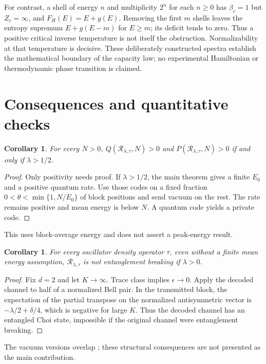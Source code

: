 \documentclass[11pt]{article}
\newtheorem{corollary}[theorem]{Corollary}
\newcommand{\Rcal}{\mathcal R_{\lambda,\tau}}
\begin{document}
For contrast, a shell of energy $n$ and multiplicity $2^n$ for
each $n\ge0$ has $\beta_c=1$ but $Z_c=\infty$, and
$F_H(E)=E+g(E)$. Removing the first $m$ shells leaves the entropy
supremum $E+g(E-m)$ for $E\ge m$; its deficit tends to zero.
Thus a positive critical inverse temperature is not itself the
obstruction. Normalizability at that temperature is decisive.
These deliberately constructed spectra establish the mathematical
boundary of the capacity law; no experimental Hamiltonian or
thermodynamic phase transition is claimed.


\section{Consequences and quantitative checks}
\begin{corollary}
For every $N>0$, $Q(\Rcal,N)>0$ and $P(\Rcal,N)>0$
if and only if $\lambda>1/2$.
\end{corollary}
\begin{proof}
Only positivity needs proof. If $\lambda>1/2$, the main theorem gives
a finite $E_0$ and a positive quantum rate. Use those codes on a fixed
fraction $0<\theta<\min\{1,N/E_0\}$ of block positions and send vacuum
on the rest. The rate remains positive and mean energy is below $N$.
A quantum code yields a private code.
\end{proof}
This uses block-average energy and does not assert a peak-energy result.

\begin{corollary}
For every oscillator density operator $\tau$, even without a finite mean
energy assumption, $\Rcal$ is not entanglement breaking if $\lambda>0$.
\end{corollary}
\begin{proof}
Fix $d=2$ and let $K\to\infty$. Trace class implies $\epsilon\to0$.
Apply the decoded channel to half of a normalized Bell pair.
In the transmitted block, the expectation of the partial transpose on
the normalized antisymmetric vector is $-\lambda/2+\delta/4$,
which is negative for large $K$.
Thus the decoded channel has an entangled Choi state, impossible if
the original channel were entanglement breaking.
\end{proof}
The vacuum versions overlap \cite{catalano}; these structural consequences
are not presented as the main contribution.
\end{document}
